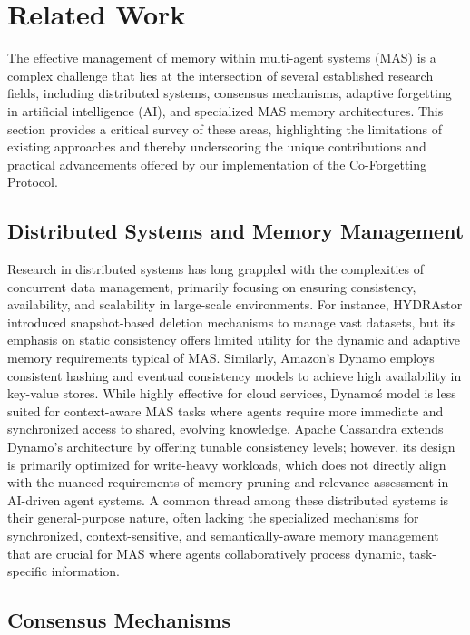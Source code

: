 \documentclass[conference]{IEEEtran}
\begin{document}
\section{Related Work}
\label{sec:related_work}

The effective management of memory within multi-agent systems (MAS) is a complex challenge that lies at the intersection of several established research fields, including distributed systems, consensus mechanisms, adaptive forgetting in artificial intelligence (AI), and specialized MAS memory architectures. This section provides a critical survey of these areas, highlighting the limitations of existing approaches and thereby underscoring the unique contributions and practical advancements offered by our implementation of the Co-Forgetting Protocol.

\subsection{Distributed Systems and Memory Management}

Research in distributed systems has long grappled with the complexities of concurrent data management, primarily focusing on ensuring consistency, availability, and scalability in large-scale environments. For instance, HYDRAstor \cite{Adya2002} introduced snapshot-based deletion mechanisms to manage vast datasets, but its emphasis on static consistency offers limited utility for the dynamic and adaptive memory requirements typical of MAS. Similarly, Amazon’s Dynamo \cite{DeCandia2007} employs consistent hashing and eventual consistency models to achieve high availability in key-value stores. While highly effective for cloud services, Dynamo\'s model is less suited for context-aware MAS tasks where agents require more immediate and synchronized access to shared, evolving knowledge. Apache Cassandra \cite{Lakshman2010} extends Dynamo’s architecture by offering tunable consistency levels; however, its design is primarily optimized for write-heavy workloads, which does not directly align with the nuanced requirements of memory pruning and relevance assessment in AI-driven agent systems. A common thread among these distributed systems is their general-purpose nature, often lacking the specialized mechanisms for synchronized, context-sensitive, and semantically-aware memory management that are crucial for MAS where agents collaboratively process dynamic, task-specific information.

\subsection{Consensus Mechanisms}
\end{document}
